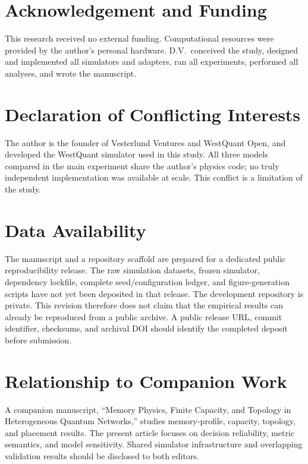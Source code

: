 \documentclass{ams-journal}
\begin{document}
\section*{Acknowledgement and Funding}

This research received no external funding. Computational resources were provided by the author's personal hardware. D.V.\ conceived the study, designed and implemented all simulators and adapters, ran all experiments, performed all analyses, and wrote the manuscript.

\section*{Declaration of Conflicting Interests}

The author is the founder of Vesterlund Ventures and WestQuant Open, and developed the WestQuant simulator used in this study. All three models compared in the main experiment share the author's physics code; no truly independent implementation was available at scale. This conflict is a limitation of the study.

\section*{Data Availability}

The manuscript and a repository scaffold are prepared for a dedicated public reproducibility release. The raw simulation datasets, frozen simulator, dependency lockfile, complete seed/configuration ledger, and figure-generation scripts have not yet been deposited in that release. The development repository is private. This revision therefore does not claim that the empirical results can already be reproduced from a public archive. A public release URL, commit identifier, checksums, and archival DOI should identify the completed deposit before submission.

\section*{Relationship to Companion Work}

A companion manuscript, ``Memory Physics, Finite Capacity, and Topology in Heterogeneous Quantum Networks,'' studies memory-profile, capacity, topology, and placement results. The present article focuses on decision reliability, metric semantics, and model sensitivity. Shared simulator infrastructure and overlapping validation results should be disclosed to both editors.



\end{document}
